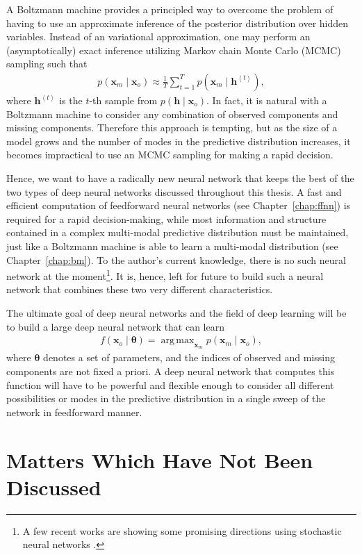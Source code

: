 \documentclass[dissertation,nocontribution,draft*]{aaltoseries}
\newcommand{\qt}[1]{\left<#1\right>}
\newcommand{\vect}[1]{\mathbf{#1}}
\newcommand{\vects}[1]{\boldsymbol{#1}}
\newcommand{\vh}[0]{\vect{h}}
\newcommand{\vx}[0]{\vect{x}}
\newcommand{\TT}[0]{{\vects{\theta}}}
\DeclareMathOperator*{\argmax}{arg\,max}
\begin{document}
A Boltzmann machine provides a principled way to overcome
the problem of having to use an approximate inference of the
posterior distribution over hidden variables. Instead of an
variational approximation, one may perform an
(asymptotically) exact inference utilizing Markov chain
Monte Carlo (MCMC) sampling such that
\begin{align*}
    p(\vx_m \mid \vx_o) \approx \frac{1}{T} \sum_{t=1}^T
    p(\vx_m \mid \vh^{\qt{t}}),
\end{align*}
where $\vh^{\qt{t}}$ is the $t$-th sample from $p(\vh \mid
\vx_o)$. In fact, it is natural with a Boltzmann machine to
consider any combination of observed components and missing
components. Therefore this approach is tempting, but as the
size of a model grows and the number of modes in the
predictive distribution increases, it becomes impractical to
use an MCMC sampling for making a rapid decision.

Hence, we want to have a radically new neural network that
keeps the best of the two types of deep neural networks
discussed throughout this thesis. A fast and efficient
computation of feedforward neural networks (see
Chapter~\ref{chap:ffnn}) is required for a rapid
decision-making, while most information and structure
contained in a complex multi-modal predictive distribution
must be maintained, just like a Boltzmann machine is able to
learn a multi-modal distribution (see
Chapter~\ref{chap:bm}). To the author's current knowledge,
there is no such neural network at the moment\footnote{
A few recent works are showing some promising directions using
stochastic neural networks \citet[see,
e.g.,][]{Bengio2013gsn,Tang2013}.  }. It is, hence, left for
future to build such a neural network that combines these
two very different characteristics.

The ultimate goal of deep neural networks and the field of
deep learning will be to build a large deep neural network
that can learn
\begin{align*}
    f(\vx_o\mid \TT) = \argmax_{\vx_m} p(\vx_m \mid \vx_o),
\end{align*}
where $\TT$ denotes a set of parameters, and the indices of
observed and missing components are not fixed a priori. A
deep neural network that computes this function will have to
be powerful and flexible enough to consider all different
possibilities or modes in the predictive distribution in a
single sweep of the network in feedforward manner.



\section{Matters Which Have Not Been Discussed}
\label{sec:leftovers}
\end{document}
